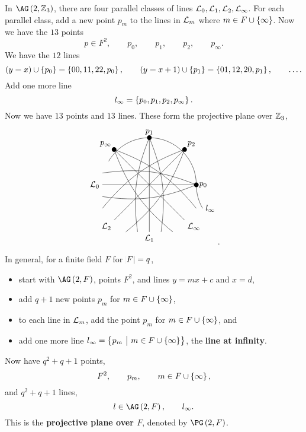 \begin{example*}
In $ \AG\br{2, \ZZ_3} $, there are four parallel classes of lines $ \mathcal{L}_0, \mathcal{L}_1, \mathcal{L}_2, \mathcal{L}_\infty $. For each parallel class, add a new point $ p_m $ to the lines in $ \mathcal{L}_m $ where $ m \in F \cup \cbr{\infty} $. Now we have the $ 13 $ points
$$ p \in F^2, \qquad p_0, \qquad p_1, \qquad p_2, \qquad p_\infty. $$
We have the $ 12 $ lines
$$ \br{y = x} \cup \cbr{p_0} = \cbr{00, 11, 22, p_0}, \qquad \br{y = x + 1} \cup \cbr{p_1} = \cbr{01, 12, 20, p_1}, \qquad \dots. $$
Add one more line
$$ l_\infty = \cbr{p_0, p_1, p_2, p_\infty}. $$
Now we have $ 13 $ points and $ 13 $ lines. These form the projective plane over $ \mathbb{Z}_3 $,
$$
\begin{tikzpicture}
\fill (4, -0.5) circle (0.1) node[right]{$ p_0 $};
\draw (0, 0) to [bend left=15] (4, -0.5);
\draw (0, -0.5) node[left]{$ \LLL_0 $} to (4, -0.5);
\draw (0, -1) to [bend right=15] (4, -0.5);
\fill (2, 1.5) circle (0.1) node[above]{$ p_1 $};
\draw (1.5, -2.5) to [bend left=15] (2, 1.5);
\draw (2, -2.5) node[below]{$ \LLL_1 $} to (2, 1.5);
\draw (2.5, -2.5) to [bend right=15] (2, 1.5);
\fill (3.5, 1) circle (0.1) node[above right]{$ p_2 $};
\draw (0, -1.5) to [bend left=15] (3.5, 1);
\draw (0.5, -2) node[below left]{$ \LLL_2 $} to (3.5, 1);
\draw (1, -2.5) to [bend right=15] (3.5, 1);
\fill (0.5, 1) circle (0.1) node[above left]{$ p_\infty $};
\draw (3, -2.5) to [bend left=15] (0.5, 1);
\draw (3.5, -2) node[below right]{$ \LLL_\infty $} to (0.5, 1);
\draw (4, -1.5) to [bend right=15] (0.5, 1);
\draw (4, -0.5) arc (0:150:2);
\draw (4, -0.5) arc (-180:-150:2) node[right]{$ l_\infty $};
\end{tikzpicture}.
$$
\end{example*}

\begin{definition*}
In general, for a finite field $ F $ for $ \abs{F} = q $,
\begin{itemize}
\item start with $ \AG\br{2, F} $, points $ F^2 $, and lines $ y = mx + c $ and $ x = d $,
\item add $ q + 1 $ new points $ p_m $ for $ m \in F \cup \cbr{\infty} $,
\item to each line in $ \mathcal{L}_m $, add the point $ p_m $ for $ m \in F \cup \cbr{\infty} $, and
\item add one more line $ l_\infty = \cbr{p_m \st m \in F \cup \cbr{\infty}} $, the \textbf{line at infinity}.
\end{itemize}
Now have $ q^2 + q + 1 $ points,
$$ F^2, \qquad p_m, \qquad m \in F \cup \cbr{\infty}, $$
and $ q^2 + q + 1 $ lines,
$$ l \in \AG\br{2, F}, \qquad l_\infty. $$
This is the \textbf{projective plane over $ F $}, denoted by $ \PG\br{2, F} $.
\end{definition*}

